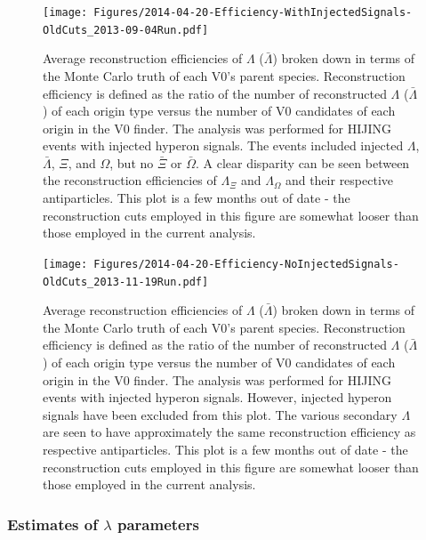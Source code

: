\begin{figure}[hbtp]
\texttt{[image: Figures/2014-04-20-Efficiency-WithInjectedSignals-OldCuts\_2013-09-04Run.pdf]}
\caption[$Lambda$ reconstruction efficiencies with injected signals]{Average reconstruction efficiencies of $\Lambda$ ($\bar{\Lambda}$) broken down in terms of the Monte Carlo truth of each V0's parent species.  
Reconstruction efficiency is defined as the ratio of the number of reconstructed $\Lambda$ ($\bar{\Lambda}$) of each origin type versus the number of V0 candidates of each origin in the V0 finder.  
The analysis was performed for HIJING events with injected hyperon signals.  
The events included injected $\Lambda$, $\bar{\Lambda}$, $\Xi$, and $\Omega$, but no $\bar{\Xi}$ or $\bar{\Omega}$.  
A clear disparity can be seen between the reconstruction efficiencies of $\Lambda_{\Xi}$ and $\Lambda_{\Omega}$ and their respective antiparticles.  
This plot is a few months out of date - the reconstruction cuts employed in this figure are somewhat looser than those employed in the current analysis.}
\label{fig:MCEfficiencyWithInjected}
\end{figure}

\begin{figure}[hbtp]
\texttt{[image: Figures/2014-04-20-Efficiency-NoInjectedSignals-OldCuts\_2013-11-19Run.pdf]}
\caption[$Lambda$ reconstruction efficiencies without injected signals]{Average reconstruction efficiencies of $\Lambda$ ($\bar{\Lambda}$) broken down in terms of the Monte Carlo truth of each V0's parent species.  
Reconstruction efficiency is defined as the ratio of the number of reconstructed $\Lambda$ ($\bar{\Lambda}$) of each origin type versus the number of V0 candidates of each origin in the V0 finder.  
The analysis was performed for HIJING events with injected hyperon signals.  
However, injected hyperon signals have been excluded from this plot.  
The various secondary $\Lambda$ are seen to have approximately the same reconstruction efficiency as respective antiparticles.  
This plot is a few months out of date - the reconstruction cuts employed in this figure are somewhat looser than those employed in the current analysis.}
\label{fig:MCEfficiencyNoInjected}
\end{figure}




\subsubsection{Estimates of \texorpdfstring{$\lambda$}{lambda} parameters}
\label{sec:LambdaParams}

